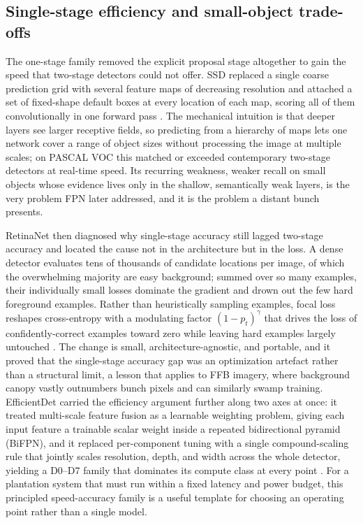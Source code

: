 \subsection{Single-stage efficiency and small-object trade-offs}

The one-stage family removed the explicit proposal stage altogether to gain the speed that two-stage detectors could not offer. SSD replaced a single coarse prediction grid with several feature maps of decreasing resolution and attached a set of fixed-shape default boxes at every location of each map, scoring all of them convolutionally in one forward pass \cite{liu2016ssd}. The mechanical intuition is that deeper layers see larger receptive fields, so predicting from a hierarchy of maps lets one network cover a range of object sizes without processing the image at multiple scales; on PASCAL VOC this matched or exceeded contemporary two-stage detectors at real-time speed. Its recurring weakness, weaker recall on small objects whose evidence lives only in the shallow, semantically weak layers, is the very problem FPN later addressed, and it is the problem a distant bunch presents.

RetinaNet then diagnosed why single-stage accuracy still lagged two-stage accuracy and located the cause not in the architecture but in the loss. A dense detector evaluates tens of thousands of candidate locations per image, of which the overwhelming majority are easy background; summed over so many examples, their individually small losses dominate the gradient and drown out the few hard foreground examples. Rather than heuristically sampling examples, focal loss reshapes cross-entropy with a modulating factor $(1-p_t)^\gamma$ that drives the loss of confidently-correct examples toward zero while leaving hard examples largely untouched \cite{lin2017focal}. The change is small, architecture-agnostic, and portable, and it proved that the single-stage accuracy gap was an optimization artefact rather than a structural limit, a lesson that applies to FFB imagery, where background canopy vastly outnumbers bunch pixels and can similarly swamp training. EfficientDet carried the efficiency argument further along two axes at once: it treated multi-scale feature fusion as a learnable weighting problem, giving each input feature a trainable scalar weight inside a repeated bidirectional pyramid (BiFPN), and it replaced per-component tuning with a single compound-scaling rule that jointly scales resolution, depth, and width across the whole detector, yielding a D0--D7 family that dominates its compute class at every point \cite{tan2020efficientdet}. For a plantation system that must run within a fixed latency and power budget, this principled speed-accuracy family is a useful template for choosing an operating point rather than a single model.


